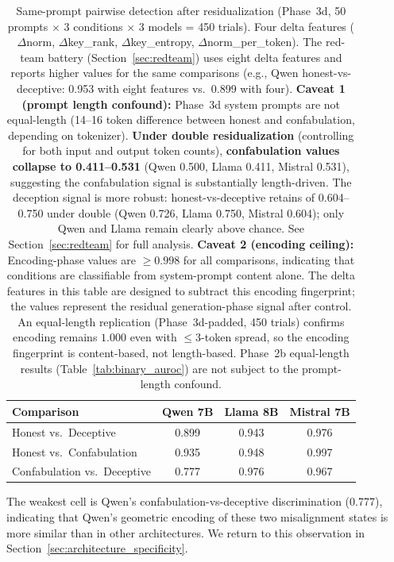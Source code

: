 \begin{table}[t]
  \centering
  \caption{Same-prompt pairwise detection \auroc after \fwl residualization (Phase~3d, 50 prompts $\times$ 3 conditions $\times$ 3 models = 450 trials).
  Four delta features ($\Delta$norm, $\Delta$key\_rank, $\Delta$key\_entropy, $\Delta$norm\_per\_token).
  The red-team battery (Section~\ref{sec:redteam}) uses eight delta features and reports higher \auroc values for the same comparisons (e.g., Qwen honest-vs-deceptive: 0.953 with eight features vs.\ 0.899 with four).
  \textbf{Caveat 1 (prompt length confound):} Phase~3d system prompts are not equal-length (14--16 token difference between honest and confabulation, depending on tokenizer).
  \textbf{Under double residualization} (controlling for both input and output token counts), \textbf{confabulation \auroc values collapse to 0.411--0.531} (Qwen 0.500, Llama 0.411, Mistral 0.531), suggesting the confabulation signal is substantially length-driven.
  The deception signal is more robust: honest-vs-deceptive retains \auroc of 0.604--0.750 under double \fwl (Qwen 0.726, Llama 0.750, Mistral 0.604); only Qwen and Llama remain clearly above chance.
  See Section~\ref{sec:redteam} for full analysis.
  \textbf{Caveat 2 (encoding ceiling):} Encoding-phase \auroc values are $\geq 0.998$ for all comparisons, indicating that conditions are classifiable from system-prompt content alone.
  The delta features in this table are designed to subtract this encoding fingerprint; the values represent the residual generation-phase signal after \fwl control.
  An equal-length replication (Phase~3d-padded, 450 trials) confirms encoding \auroc remains $1.000$ even with $\leq 3$-token spread, so the encoding fingerprint is content-based, not length-based.
  Phase~2b equal-length results (Table~\ref{tab:binary_auroc}) are not subject to the prompt-length confound.}
  \label{tab:sameprompt_auroc}
  \begin{tabular}{@{}lccc@{}}
    \toprule
    Comparison & Qwen 7B & Llama 8B & Mistral 7B \\
    \midrule
    Honest vs.\ Deceptive      & 0.899 & 0.943 & 0.976 \\
    Honest vs.\ Confabulation   & 0.935 & 0.948 & 0.997 \\
    Confabulation vs.\ Deceptive & 0.777 & 0.976 & 0.967 \\
    \bottomrule
  \end{tabular}
\end{table}

\noindent The weakest cell is Qwen's confabulation-vs-deceptive discrimination (0.777), indicating that Qwen's geometric encoding of these two misalignment states is more similar than in other architectures.
We return to this observation in Section~\ref{sec:architecture_specificity}.

